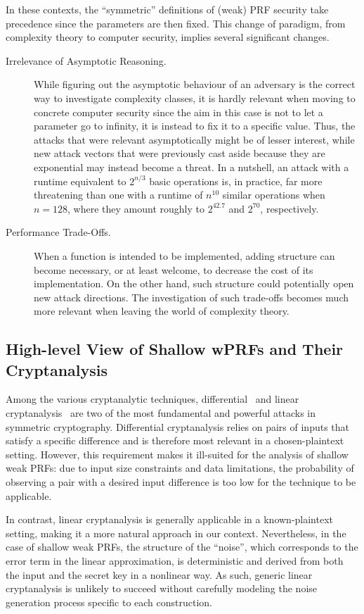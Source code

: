 In these contexts, the ``symmetric'' definitions of (weak) PRF security take precedence since the parameters are then fixed. This change of paradigm, from complexity theory to computer security, implies several significant changes.
\begin{description}
\item[Irrelevance of Asymptotic Reasoning.] While figuring out the asymptotic behaviour of an adversary is the correct way to investigate complexity classes, it is hardly relevant when moving to concrete computer security since the aim in this case is not to let a parameter go to infinity, it is instead to fix it to a specific value. Thus, the attacks that were relevant asymptotically might be of lesser interest, while new attack vectors that were previously cast aside because they are exponential may instead become a threat. In a nutshell, an attack with a runtime equivalent to $2^{n/3}$ basic operations is, in practice, far more threatening than one with a runtime of $n^{10}$ similar operations when $n = 128$, where they amount roughly to $2^{42.7}$ and $2^{70}$, respectively.
\item[Performance Trade-Offs.] When a function is intended to be implemented, adding structure can become necessary, or at least welcome, to decrease the cost of its implementation. On the other hand, such structure could potentially open new attack directions. The investigation of such trade-offs becomes much more relevant when leaving the world of complexity theory.
\end{description}



\subsection{High-level View of Shallow wPRFs and Their Cryptanalysis}


Among the various cryptanalytic techniques, differential~\cite{C:BihSha90} and linear cryptanalysis~\cite{EC:Matsui93} are two of the most fundamental and powerful attacks in symmetric cryptography. Differential cryptanalysis relies on pairs of inputs that satisfy a specific difference and is therefore most relevant in a chosen-plaintext setting. However, this requirement makes it ill-suited for the analysis of shallow weak PRFs: due to input size constraints and data limitations, the probability of observing a pair with a desired input difference is too low for the technique to be applicable.

 In contrast, linear cryptanalysis is generally applicable in a known-plaintext setting, making it a more natural approach in our context. Nevertheless, in the case of shallow weak PRFs, the structure of the ``noise'', which corresponds to the error term in the linear approximation, is deterministic and derived from both the input and the secret key in a nonlinear way. As such, generic linear cryptanalysis is unlikely to succeed without carefully modeling the noise generation process specific to each construction.

